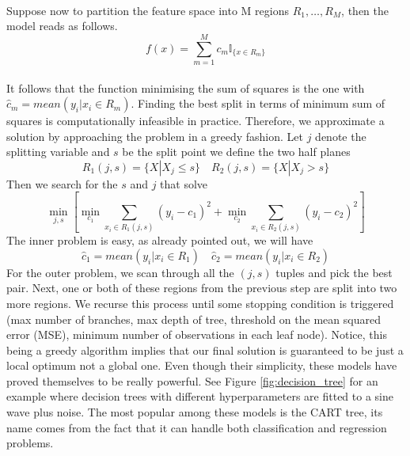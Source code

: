 \\
Suppose now to partition the feature space into M regions $R_1,\dots,R_M$, then the model reads as follows.
\begin{equation}
    f(x)=\sum\limits_{m=1}^{M}c_m\mathbb{I}_{\{x \in R_m\}}
\end{equation}
\\
It follows that the function minimising the sum of squares is the one with $\hat{c}_m=mean(y_i|x_i \in R_m)$.
Finding the best split in terms of minimum sum of squares is computationally infeasible in practice. Therefore, we approximate a solution by approaching the problem in a greedy fashion.
Let $j$ denote the splitting variable and $s$ be the split point we define the two half planes
\begin{equation}
    R_1(j,s)=\{X|X_j\leq s\} \quad R_2(j,s)=\{X|X_j >s\}
\end{equation}
Then we search for the $s$ and $j$ that solve
\begin{equation}
    \min_{j,s}\left[\min_{c_1} \sum\limits_{x_i \in R_1(j,s)}(y_i-c_1)^2+\min_{c_2} \sum\limits_{x_i \in R_2(j,s)}(y_i-c_2)^2\right]
\end{equation}
The inner problem is easy, as already pointed out, we will have 
\begin{equation}
    \hat{c}_1=mean(y_i|x_i \in R_1) \quad \hat{c}_2=mean(y_i|x_i \in R_2)
\end{equation}
For the outer problem, we scan through all the $(j,s)$ tuples and pick the best pair. 
Next, one or both of these regions from the previous step are split into two more regions. We recurse this process until some stopping condition is triggered (max number of branches, max depth of tree, threshold on the mean squared error (MSE), minimum number of observations in each leaf node).
Notice, this being a greedy algorithm implies that our final solution is guaranteed to be just a local optimum not a global one.
Even though their simplicity, these models have proved themselves to be really powerful. See Figure \ref{fig:decision_tree} for an example where decision trees with different hyperparameters are fitted to a sine wave plus noise. The most popular among these models is the CART \cite{breiman2017classification} tree, its name comes from the fact that it can handle both classification and regression problems.
